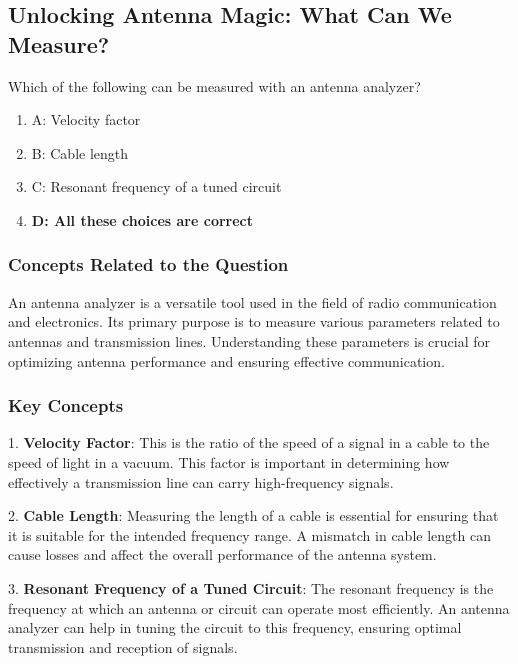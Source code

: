 \subsection{Unlocking Antenna Magic: What Can We Measure?}

\begin{tcolorbox}[colback=gray!10, colframe=black, title=E4A11] Which of the following can be measured with an antenna analyzer?
\begin{enumerate}
    \item A: Velocity factor
    \item B: Cable length
    \item C: Resonant frequency of a tuned circuit
    \item \textbf{D: All these choices are correct}
\end{enumerate} \end{tcolorbox}

\subsubsection*{Concepts Related to the Question}

An antenna analyzer is a versatile tool used in the field of radio communication and electronics. Its primary purpose is to measure various parameters related to antennas and transmission lines. Understanding these parameters is crucial for optimizing antenna performance and ensuring effective communication.

\subsubsection*{Key Concepts}

1. \textbf{Velocity Factor}: This is the ratio of the speed of a signal in a cable to the speed of light in a vacuum. This factor is important in determining how effectively a transmission line can carry high-frequency signals.

2. \textbf{Cable Length}: Measuring the length of a cable is essential for ensuring that it is suitable for the intended frequency range. A mismatch in cable length can cause losses and affect the overall performance of the antenna system.

3. \textbf{Resonant Frequency of a Tuned Circuit}: The resonant frequency is the frequency at which an antenna or circuit can operate most efficiently. An antenna analyzer can help in tuning the circuit to this frequency, ensuring optimal transmission and reception of signals.

